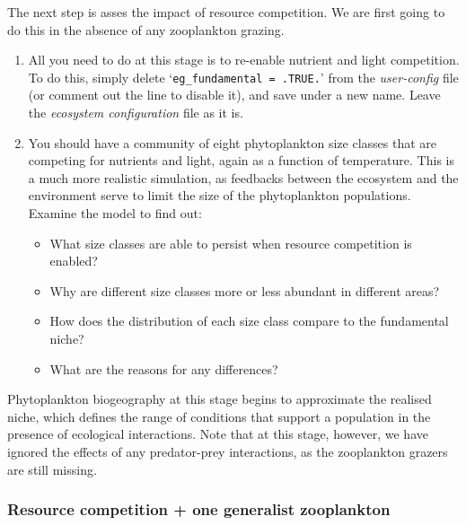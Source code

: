 \documentclass[11pt,fleqn]{book} %
\begin{document}
The next step is asses the impact of resource competition. We are first going to do this in the absence of any zooplankton grazing. 

\begin{enumerate}[noitemsep]
\vspace{1mm}
\item All you need to do at this stage is to re-enable nutrient and light competition. To do this, simply delete `\texttt{eg\_fundamental~=~.TRUE.}' from the \textit{user-config} file (or comment out the line to disable it), and save under a new name. Leave the \textit{ecosystem configuration} file as it is.

\vspace{1mm}
\item You should have a community of eight phytoplankton size classes that are competing for nutrients and light, again as a function of temperature. This is a much more realistic simulation, as feedbacks between the ecosystem and the environment serve to limit the size of the phytoplankton populations. \\Examine the model to find out:
\begin{itemize}
\item What size classes are able to persist when resource competition is enabled?
\item Why are different size classes more or less abundant in different areas?
\item How does the distribution of each size class compare to the fundamental niche?
\item What are the reasons for any differences?
\end{itemize}
\end{enumerate}
\vspace{1mm}

Phytoplankton biogeography at this stage begins to approximate the realised niche, which defines the range of conditions that support a population in the presence of ecological interactions. Note that at this stage, however, we have ignored the effects of any predator-prey interactions, as the zooplankton grazers are still missing.


\subsubsection*{Resource competition + one generalist zooplankton} 
\end{document}
